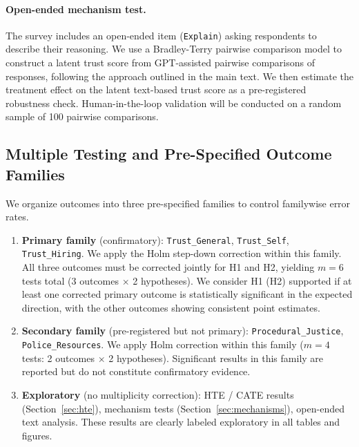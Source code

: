\paragraph{Open-ended mechanism test.}
The survey includes an open-ended item (\texttt{Explain}) asking respondents to describe their reasoning.
We use a Bradley-Terry pairwise comparison model \citep{Bradley1952} to construct a latent trust score from GPT-assisted pairwise comparisons of responses, following the approach outlined in the main text.
We then estimate the treatment effect on the latent text-based trust score as a pre-registered robustness check.
Human-in-the-loop validation will be conducted on a random sample of 100 pairwise comparisons.

\subsection{Multiple Testing and Pre-Specified Outcome Families}
\label{sec:multiple-testing}

We organize outcomes into three pre-specified families to control familywise error rates.

\begin{enumerate}
    \item \textbf{Primary family} (confirmatory): \texttt{Trust\_General}, \texttt{Trust\_Self}, \texttt{Trust\_Hiring}.
    We apply the Holm step-down correction \citep{Holm1979} within this family.
    All three outcomes must be corrected jointly for H1 and H2, yielding $m = 6$ tests total (3 outcomes $\times$ 2 hypotheses).
    We consider H1 (H2) supported if at least one corrected primary outcome is statistically significant in the expected direction, with the other outcomes showing consistent point estimates.

    \item \textbf{Secondary family} (pre-registered but not primary): \texttt{Procedural\_Justice}, \texttt{Police\_Resources}.
    We apply Holm correction within this family ($m = 4$ tests: 2 outcomes $\times$ 2 hypotheses).
    Significant results in this family are reported but do not constitute confirmatory evidence.

    \item \textbf{Exploratory} (no multiplicity correction): HTE / CATE results (Section~\ref{sec:hte}), mechanism tests (Section~\ref{sec:mechanisms}), open-ended text analysis.
    These results are clearly labeled exploratory in all tables and figures.
\end{enumerate}

